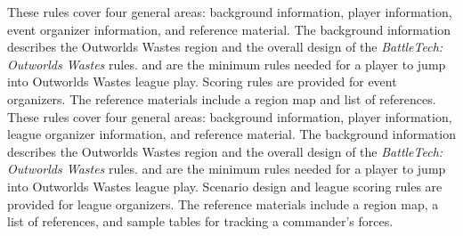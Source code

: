  {
These rules cover four general areas: background information, player information, event organizer information, and reference material.
The background information describes the Outworlds Wastes region and the overall design of the \emph{BattleTech: Outworlds Wastes} rules.
 and  are the minimum rules needed for a player to jump into Outworlds Wastes league play.
Scoring rules are provided for event organizers.
The reference materials include a region map and list of references.
} {
These rules cover four general areas: background information, player information, league organizer information, and reference material.
The background information describes the Outworlds Wastes region and the overall design of the \emph{BattleTech: Outworlds Wastes} rules.
 and  are the minimum rules needed for a player to jump into Outworlds Wastes league play.
Scenario design and league scoring rules are provided for league organizers.
The reference materials include a region map, a list of references, and sample tables for tracking a commander's forces.
}
